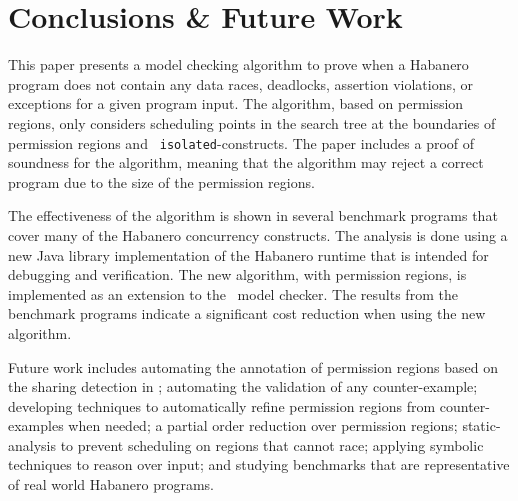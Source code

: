 \section{Conclusions \& Future Work}
This paper presents a model checking algorithm to prove when a
Habanero program does not contain any data races, deadlocks, assertion
violations, or exceptions for a given program input. The algorithm,
based on permission regions, only considers scheduling points in the
search tree at the boundaries of permission regions and {\tt
  isolated}-constructs. The paper includes a proof of soundness for
the algorithm, meaning that the algorithm may reject a correct program
due to the size of the permission regions.

The effectiveness of the algorithm is shown in several benchmark
programs that cover many of the Habanero concurrency constructs. The
analysis is done using a new Java library implementation of the Habanero
runtime that is intended for debugging and verification. The new algorithm, with permission regions,
is implemented as an extension to the \jpf\ model checker. The results
from the benchmark programs indicate a significant cost reduction when
using the new algorithm.

Future work includes automating the annotation of permission regions
based on the sharing detection in \jpf; automating the validation of any
counter-example; developing techniques to automatically refine
permission regions from counter-examples when needed; a partial order
reduction over permission regions; static-analysis to prevent
scheduling on regions that cannot race; applying symbolic techniques to reason over input; and studying
benchmarks that are representative of real world Habanero programs.

